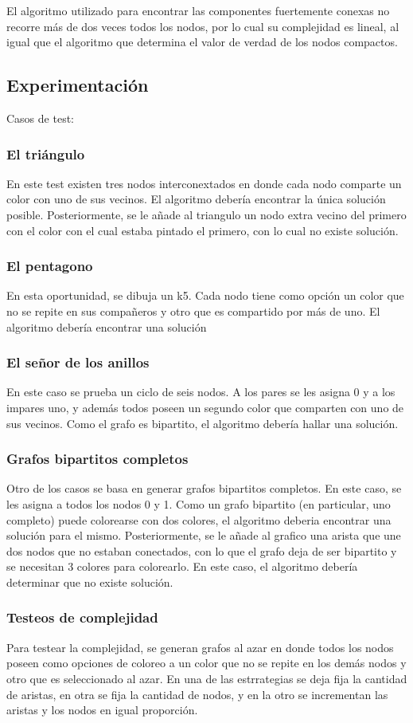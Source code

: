 El algoritmo utilizado para encontrar las componentes fuertemente conexas no recorre más de dos veces todos los nodos, por lo cual su complejidad es lineal, al igual que el algoritmo que determina el valor de verdad de los nodos compactos.

\subsection{Experimentación}
Casos de test:
\subsubsection{El triángulo}
En este test existen tres nodos interconextados en donde cada nodo comparte un color con uno de sus vecinos. El algoritmo debería encontrar la única solución posible.
Posteriormente, se le añade al triangulo un nodo extra vecino del primero con el color con el cual estaba pintado el primero, con lo cual no existe solución.
\subsubsection{El pentagono}
En esta oportunidad, se dibuja un k5. Cada nodo tiene como opción un color que no se repite en sus compañeros y otro que es compartido por más de uno. El algoritmo debería encontrar una solución
\subsubsection{El señor de los anillos}
En este caso se prueba un ciclo de seis nodos. A los pares se les asigna 0 y a los impares uno, y además todos poseen un segundo color que comparten con uno de sus vecinos. Como el grafo es bipartito, el algoritmo debería hallar una solución.
\subsubsection{Grafos bipartitos completos}
Otro de los casos se basa en generar grafos bipartitos completos. En este caso, se les asigna a todos los nodos 0 y 1. Como un grafo bipartito (en particular, uno completo) puede colorearse con dos colores, el algoritmo deberia encontrar una solución para el mismo. Posteriormente, se le añade al grafico una arista que une dos nodos que no estaban conectados, con lo que el grafo deja de ser bipartito y se necesitan 3 colores para colorearlo. En este caso, el algoritmo debería determinar que no existe solución.

\subsubsection{Testeos de complejidad}
Para testear la complejidad, se generan grafos al azar en donde todos los nodos poseen como opciones de coloreo a un color que no se repite en los demás nodos y otro que es seleccionado al azar. En una de las estrrategias se deja fija la cantidad de aristas, en otra se fija la cantidad de nodos, y en la otro se incrementan las aristas y los nodos en igual proporción.

